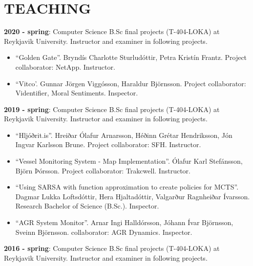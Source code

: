 \section{TEACHING}
\textbf{2020 - spring}:
Computer Science B.Sc final projects (T-404-LOKA) at Reykjavik University.
Instructor and examiner in following projects.

\begin{itemize}
\item ``Golden Gate''. Bryndís Charlotte Sturludóttir, Petra Kristín Frantz.
    Project collaborator: NetApp. Instructor.

\item ``Vitco'. Gunnar Jörgen Viggósson, Haraldur Björnsson. Project collaborator: Videntifier, Moral Sentiments. Inspector.
\end{itemize}

\textbf{2019 - spring}:
Computer Science B.Sc final projects (T-404-LOKA) at Reykjavik University.
Instructor and examiner in following projects.

\begin{itemize}
\item ``Hljóðrit.is''. Hreiðar Ólafur Arnarsson, Héðinn Grétar Hendriksson, Jón
    Ingvar Karlsson Brune. Project collaborator: SFH. Instructor.

\item ``Vessel Monitoring System - Map Implementation''. Ólafur Karl Stefánsson,
	Björn Þórsson. Project collaborator: Trakcwell. Instructor.

\item ``Using SARSA with function approximation to create policies for MCTS''.
	Dagmar Lukka Loftsdóttir, Hera Hjaltadóttir, Valgarður Ragnheiðar Ívarsson.
		Research Bachelor of Science (B.Sc.). Inspector.

\item ``AGR System Monitor''. Arnar Ingi Halldórsson, Jóhann Ívar Björnsson,
    Sveinn Björnsson. collaborator: AGR Dynamics. Inspector.
\end{itemize}

\textbf{2016 - spring}:
Computer Science B.Sc final projects (T-404-LOKA) at Reykjavik University.
Instructor and examiner in following projects.

